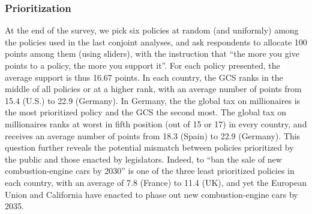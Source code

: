 \subsubsection{Prioritization} %
At the end of the survey, we pick six policies at random (and uniformly) among the policies used in the last conjoint analyses, and ask respondents to allocate 100 points among them (using sliders), with the instruction that ``the more you give points to a policy, the more you support it''. For each policy presented, the average support is thus 16.67 points. %
In each country, the GCS ranks in the middle of all policies or at a higher rank, with an average number of points from 15.4 (U.S.) to 22.9 (Germany). 
In Germany, the the global tax on millionaires is the most prioritized policy and  the GCS the second most. The global tax on millionaires ranks at worst in fifth position (out of 15 or 17) in every country, and receives an average number of points from 18.3 (Spain) to 22.9 (Germany). 
This question further reveals the potential mismatch between policies prioritized by the public and those enacted by legislators. Indeed, to ``ban the sale of new combustion-engine cars by 2030'' is one of the three least prioritized policies in each country, with an average of 7.8 (France) to 11.4 (UK), and yet the European Union and California have enacted to phase out %
new combustion-engine cars by 2035. 

  
